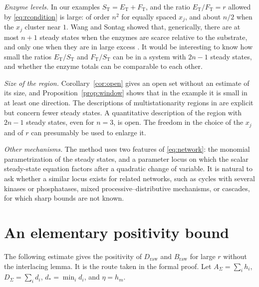 \documentclass[11pt]{article}
\theoremstyle{plain}
\theoremstyle{definition}
\theoremstyle{remark}
\numberwithin{equation}{section}
\newcommand{\raw}{\mathrm{raw}}
\newcommand{\ET}{E_{\mathrm T}}
\newcommand{\FT}{F_{\mathrm T}}
\newcommand{\ST}{S_{\mathrm T}}
\begin{document}
\emph{Enzyme levels.} In our examples \(\ST=\ET+\FT\), and the ratio \(\ET/\FT=r\) allowed by
\eqref{eq:rcondition} is large: of order \(n^2\) for equally spaced \(x_j\), and about
\(n/2\) when the \(x_j\) cluster near \(1\). Wang and Sontag showed that, generically, there are at
most \(n+1\) steady states when the enzymes are scarce relative to the substrate, and only
one when they are in large excess \cite[Theorems~4 and~5]{WangSontag2008}. It would be interesting to know how small the ratios \(\ET/\ST\)
and \(\FT/\ST\) can be in a system with \(2n-1\) steady states, and whether the enzyme totals
can be comparable to each other.

\emph{Size of the region.} Corollary~\ref{cor:open} gives an open set without an estimate of
its size, and Proposition~\ref{prop:window} shows that in the example it is small in at least
one direction. The descriptions of multistationarity regions in
\cite{CFMW2017,BihanDickensteinGiaroli2020,GRPD2019,FKdWY2022} are explicit but concern fewer
steady states. A quantitative description of the region with \(2n-1\) steady states, even
for \(n=3\), is open. The freedom in the choice of the \(x_j\) and of \(r\) can presumably be
used to enlarge it.

\emph{Other mechanisms.} The method uses two features of \eqref{eq:network}: the monomial
parametrization of the steady states, and a parameter locus on which the scalar steady-state
equation factors after a quadratic change of variable. It is natural to ask whether a
similar locus exists for related networks, such as cycles with several kinases or
phosphatases, mixed processive--distributive mechanisms, or cascades, for which sharp bounds
are not known.

\appendix
\section{An elementary positivity bound}\label{app:bound}
The following estimate gives the positivity of \(D_{\raw}\) and \(B_{\raw}\) for large \(r\)
without the interlacing lemma. It is the route taken in the formal proof. Let
\(A_\Sigma=\sum_ih_i\), \(D_\Sigma=\sum_id_i\), \(d_\ast=\min_id_i\), and \(\eta=h_m\).
\end{document}
